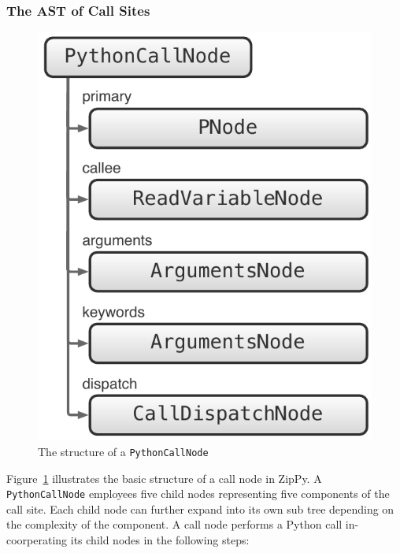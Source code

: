 \subsubsection{The AST of Call Sites}

\begin{figure}
\centering
\includegraphics[scale=.5]{figures/ch5-python-call-node-basic}
\caption{The structure of a \texttt{PythonCallNode}}
\label{fig:ch5-python-call-node-basic}
\end{figure}

Figure~\ref{fig:ch5-python-call-node-basic} illustrates the basic structure of a call node in ZipPy.
A \texttt{PythonCallNode} employees five child nodes representing five components of the call site.
Each child node can further expand into its own sub tree depending on the complexity of the component.
A call node performs a Python call in-coorperating its child nodes in the following steps:

